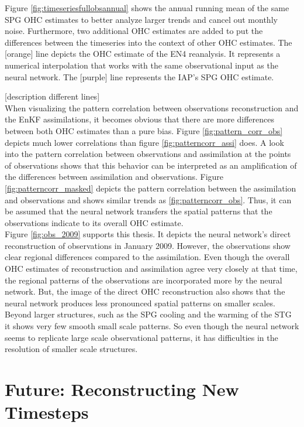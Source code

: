 \documentclass[Masterarbeit.tex]{subfile}
\begin{document}
	
	Figure \ref{fig:timeseriesfullobsannual} shows the annual running mean of the same SPG OHC estimates to better analyze larger trends and cancel out monthly noise. Furthermore, two additional OHC estimates are added to put the differences between the timeseries into the context of other OHC estimates. The [orange] line depicts the OHC estimate of the EN4 reanalysis. It represents a numerical interpolation that works with the same observational input as the neural network. The [purple] line represents the IAP's SPG OHC estimate. 
	
	[description different lines]\\
	
	
	When visualizing the pattern correlation between observations reconstruction and the EnKF assimilations, it becomes obvious that there are more differences between both OHC estimates than a pure bias. Figure \ref{fig:pattern_corr_obs} depicts much lower correlations than figure \ref{fig:patterncorr_assi} does. A look into the pattern correlation between observations and assimilation at the points of observations shows that this behavior can be interpreted as an amplification of the differences between assimilation and observations. Figure \ref{fig:patterncorr_masked} depicts the pattern correlation between the assimilation and observations and shows similar trends as \ref{fig:patterncorr_obs}. Thus, it can be assumed that the neural network transfers the spatial patterns that the observations indicate to its overall OHC estimate. \\
	
	
	
	Figure \ref{fig:obs_2009} supports this thesis. It depicts the neural network's direct reconstruction of observations in January 2009. However, the observations show clear regional differences compared to the assimilation. Even though the overall OHC estimates of reconstruction and assimilation agree very closely at that time, the regional patterns of the observations are incorporated more by the neural network. But, the image of the direct OHC reconstruction also shows that the neural network produces less pronounced spatial patterns on smaller scales. Beyond larger structures, such as the SPG cooling and the warming of the STG it shows very few smooth small scale patterns. So even though the neural network seems to replicate large scale observational patterns, it has difficulties in the resolution of smaller scale structures. 
	\\
	
	\section{Future: Reconstructing New Timesteps} \label{analysis_future}
	
\end{document}
